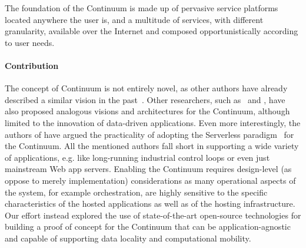 The foundation of the Continuum is made up of pervasive service platforms located anywhere the user is, and a multitude of services, with different granularity, available over the Internet and composed opportunistically according to user needs.


\paragraph{Contribution}

The concept of Continuum is not entirely novel, as other authors have already described a similar vision in the past~\cite{balouek2019towards, beckman2020harnessing}. Other researchers, such as~\cite{abdelbaky2017computing} and \cite{balouek2019towards}, have also proposed analogous visions and architectures for the Continuum, although limited to the innovation of data-driven applications. Even more interestingly, the authors of \cite{risco2021serverless} have argued the practicality of adopting the Serverless paradigm~\cite{shafiei2022serverless} for the Continuum. All the mentioned authors fall short in supporting a wide variety of applications, e.g. like long-running industrial control loops or even just mainstream Web app servers. Enabling the Continuum requires design-level (as oppose to merely implementation) considerations as many operational aspects of the system, for example orchestration, are highly sensitive to the specific characteristics of the hosted applications as well as of the hosting infrastructure. Our effort instead explored the use of state-of-the-art open-source technologies for building a proof of concept for the Continuum that can be application-agnostic and capable of supporting data locality and computational mobility.

